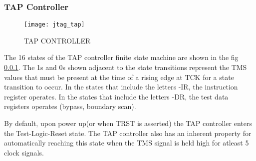 \documentclass[a4paper,11pt]{article}
\begin{document}
\subsubsection{TAP Controller}

\begin{figure}[ht]
\centering
\texttt{[image: jtag\_tap]}
\label{fig:jtag_tap}
\caption{TAP CONTROLLER}
\end{figure}

The 16 states of the TAP controller finite state machine are shown in the fig \ref{}. The 1s and 0s shown adjacent to the state transitions represent the TMS values that must be present at the time of a rising edge at TCK for a state transition to occur. In the states that include the letters -IR, the instruction register operates. In the states that include the letters -DR, the test data registers operates (bypass, boundary scan).

By default, upon power up(or when TRST is asserted) the TAP controller enters the Test-Logic-Reset state. The TAP controller also has an inherent property for automatically reaching this state when the TMS signal is held high for atleast 5 clock signals.
\end{document}
